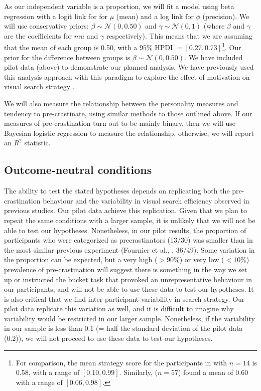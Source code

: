 \documentclass[]{rsos}
\begin{document}
As our independent variable is a proportion, we will fit a model using beta regression \cite{ferrari2004beta} with a logit link for for $\mu$ (mean) and a log link for $\phi$ (precision). We will use conservative priors: $\beta \sim\mathcal{N}(0, 0.50)$ and $\gamma \sim\mathcal{N}(0, 1)$ (where $\beta$ and $\gamma$ are the coefficients for $mu$ and $\gamma$ respectively). This means that we are assuming that the mean of each group is 0.50, with a $95\%$ HPDI $= [0.27, 0.73]$\footnote{For comparison, the mean strategy score for the participants in \cite{nowakowska2017} with $n=14$ is 0.58, with a range of $[0.10, 0.99]$. Similarly, \cite{clarke2019} ($n=57$) found a mean of 0.60 with a range of $[0.06, 0.98]$.}. Our prior for the difference between groups is $\beta \sim\mathcal{N}(0, 0.50)$. We have included pilot data (above) to demonstrate our planned analysis. We have previously used this analysis approach with this paradigm to explore the effect of motivation on visual search strategy \cite{james2019}.

We will also measure the relationship between the personality measures and tendency to pre-crastinate, using similar methods to those outlined above. If our measures of pre-crastination turn out to be mainly binary, then we will use Bayesian logistic regression to measure the relationship, otherwise, we will report an $R^2$ statistic. 

\subsection{Outcome-neutral conditions} The ability to test the stated hypotheses depends on replicating both the pre-crastination behaviour and the variability in visual search efficiency observed in previous studies. Our pilot data achieve this replication. Given that we plan to repeat the same conditions with a larger sample, it is unlikely that we will not be able to test our hypotheses. Nonetheless, in our pilot results, the proportion of participants who were categorized as precrastinators (13/30) was smaller than in the most similar previous experiment (Fournier et al., \cite{fournier2019task}, 36/49). Some variation in the proportion can be expected, but a very high ($>90\%$) or very low ($<10\%$) prevalence of pre-crastination will suggest there is something in the way we set up or instructed the bucket task that provoked an unrepresentative behaviour in our participants, and will not be able to use these data to test our hypotheses. It is also critical that we find inter-participant variability in search strategy. Our pilot data replicate this variation as well, and it is difficult to imagine why variability would be restricted in our larger sample. Nonetheless, if the variability in our sample is less than 0.1 (= half the standard deviation of the pilot data (0.2)), we will not proceed to use these data to test our hypotheses. 
\end{document}
